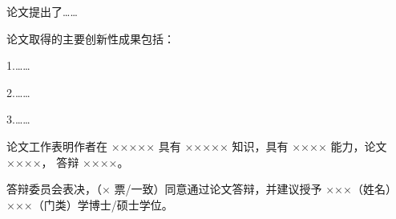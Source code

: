 
\begin{resolution}
    论文提出了……
    
    论文取得的主要创新性成果包括：

    1.……

    2.……

    3.……

    论文工作表明作者在 ××××× 具有 ××××× 知识，具有 ×××× 能力，论文 ××××，
    答辩 ××××。

    答辩委员会表决，（× 票/一致）同意通过论文答辩，并建议授予 ×××（姓名）
    ×××（门类）学博士/硕士学位。


\end{resolution}
